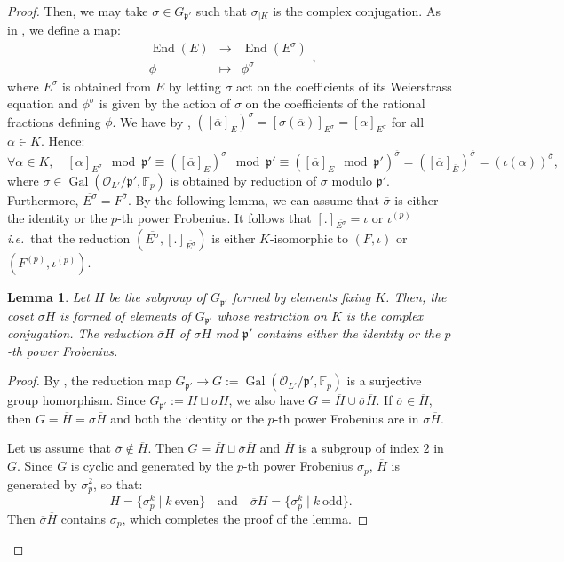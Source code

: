 \documentclass[a4paper,10pt,notitlepage]{report}
\theoremstyle{definition}
\theoremstyle{plain}
\newtheorem{Lemma}[Definition]{Lemma}
\theoremstyle{definition}
\newcommand{\ie}{\emph{i.e.}\ }
\newcommand{\F}{\mathbb{F}}
\newcommand{\mO}{\mathcal{O}}
\renewcommand{\(}{\left(}
\renewcommand{\)}{\right)}
\newcommand{\mfp}{\mathfrak{p}}
\DeclareMathOperator{\End}{End}
\DeclareMathOperator{\Gal}{Gal}
\begin{document}
\begin{proof}
Then, we may take $\sigma\in G_{\mfp'}$ such that $\sigma_{|K}$ is the complex conjugation. As in \cite[§ II.2]{Silverman2}, we define a map:
\[\begin{array}{rcl}\End(E)&\longrightarrow&\End(E^{\sigma})\\
\phi &\longmapsto &\phi^\sigma
\end{array},\]
where $E^{\sigma}$ is obtained from $E$ by letting $\sigma$ act on the coefficients of its Weierstrass equation and $\phi^\sigma$ is given by the action of $\sigma$ on the coefficients of the rational fractions defining $\phi$. We have by \cite[Theorem II.2.2.(a)]{Silverman2}, $([\overline{\alpha}]_E)^\sigma=[\sigma(\overline{\alpha})]_{E^\sigma}=[\alpha]_{E^\sigma}$ for all $\alpha\in K$.  Hence:
\[\forall\alpha\in K, \quad [\alpha]_{E^\sigma} \mod\mfp'\equiv ([\overline{\alpha}]_E)^\sigma \mod\mfp'\equiv \([\overline{\alpha}]_E \mod\mfp'\)^{\overline{\sigma}}= ([\overline{\alpha}]_{\overline{E}})^{\overline{\sigma}}= (\iota(\alpha))^{\overline{\sigma}},\]
where $\overline{\sigma}\in\Gal(\mO_{L'}/\mfp',\F_p)$ is obtained by reduction of $\sigma$ modulo $\mfp'$. Furthermore, $\overline{E^{\sigma}}=F^{\overline{\sigma}}$. By the following lemma, we can assume that $\overline{\sigma}$ is either the identity or the $p$-th power Frobenius. It follows that $[.]_{\overline{E^{\sigma}}}=\iota$ or $\iota^{(p)}$ \ie that the reduction $(\overline{E^{\sigma}},[.]_{\overline{E^{\sigma}}})$ is either $K$-isomorphic to $(F,\iota)$ or $(F^{(p)},\iota^{(p)})$.

\begin{Lemma}
Let $H$ be the subgroup of $G_{\mfp'}$ formed by elements fixing $K$. Then, the coset $\sigma H$ is formed of elements of $G_{\mfp'}$ whose restriction on $K$ is the complex conjugation. The reduction $\overline{\sigma}\overline{H}$ of $\sigma H$ mod $\mfp'$ contains either the identity or the $p$-th power Frobenius.
\end{Lemma}

\begin{proof}
By \cite[propostion I.14]{Lang_ANT}, the reduction map $G_{\mfp'}\longrightarrow G:=\Gal(\mO_{L'}/\mfp',\F_p)$ is a surjective group homorphism.  Since $G_{\mfp'}:=H\sqcup\sigma H$, we also have $G=\overline{H}\cup\overline{\sigma}\overline{H}$. If $\overline{\sigma}\in \overline{H}$, then $G=\overline{H}=\overline{\sigma}\overline{H}$ and both the identity or the $p$-th power Frobenius are in $\overline{\sigma}\overline{H}$.

Let us assume that $\overline{\sigma}\not\in \overline{H}$. Then $G=\overline{H}\sqcup\overline{\sigma}\overline{H}$ and $\overline{H}$ is a subgroup of index $2$ in $G$. Since $G$ is cyclic and generated by the $p$-th power Frobenius $\sigma_p$, $\overline{H}$ is generated by $\sigma_p^2$, so that:
\[\overline{H}=\{\sigma_p^k\mid k \ \mbox{even}\} \quad \mbox{and} \quad \overline{\sigma}\overline{H}=\{\sigma_p^k\mid k \ \mbox{odd}\}.\]
Then $\overline{\sigma}\overline{H}$ contains $\sigma_p$, which completes the proof of the lemma. 
\end{proof}


\end{proof}
\end{document}
